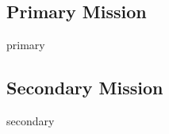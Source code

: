 \documentclass[class=report, crop=false]{standalone}
\begin{document}
\subsection{Primary Mission}
{primary}
\subsection{Secondary Mission}
{secondary}
\end{document}
